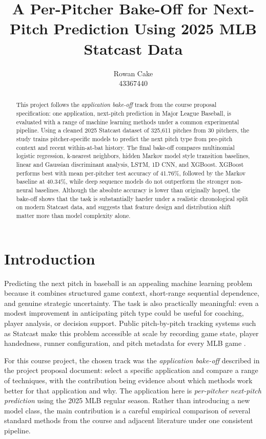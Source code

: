 \documentclass{article}
\title{A Per-Pitcher Bake-Off for Next-Pitch Prediction Using 2025 MLB Statcast Data}
\author{%
  Rowan Cake\\
  43367440
}
\begin{document}
\maketitle

\begin{abstract}
This project follows the \emph{application bake-off} track from the course proposal specification: one application, next-pitch prediction in Major League Baseball, is evaluated with a range of machine learning methods under a common experimental pipeline. Using a cleaned 2025 Statcast dataset of 325{,}611 pitches from 30 pitchers, the study trains pitcher-specific models to predict the next pitch type from pre-pitch context and recent within-at-bat history. The final bake-off compares multinomial logistic regression, k-nearest neighbors, hidden Markov model style transition baselines, linear and Gaussian discriminant analysis, LSTM, 1D CNN, and XGBoost. XGBoost performs best with mean per-pitcher test accuracy of 41.76\%, followed by the Markov baseline at 40.34\%, while deep sequence models do not outperform the stronger non-neural baselines. Although the absolute accuracy is lower than originally hoped, the bake-off shows that the task is substantially harder under a realistic chronological split on modern Statcast data, and suggests that feature design and distribution shift matter more than model complexity alone.
\end{abstract}

\section{Introduction}
Predicting the next pitch in baseball is an appealing machine learning problem because it combines structured game context, short-range sequential dependence, and genuine strategic uncertainty. The task is also practically meaningful: even a modest improvement in anticipating pitch type could be useful for coaching, player analysis, or decision support. Public pitch-by-pitch tracking systems such as Statcast make this problem accessible at scale by recording game state, player handedness, runner configuration, and pitch metadata for every MLB game \citep{statcast}.

For this course project, the chosen track was the \emph{application bake-off} described in the project proposal document: select a specific application and compare a range of techniques, with the contribution being evidence about which methods work better for that application and why. The application here is \emph{per-pitcher next-pitch prediction} using the 2025 MLB regular season. Rather than introducing a new model class, the main contribution is a careful empirical comparison of several standard methods from the course and adjacent literature under one consistent pipeline.
\end{document}
